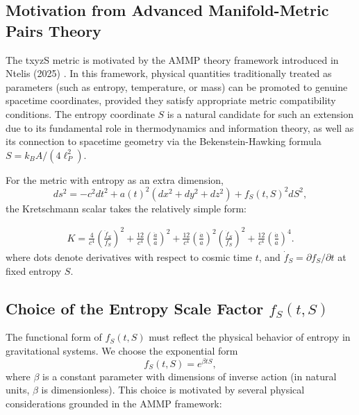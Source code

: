 \documentclass[11pt,a4paper]{article}
\begin{document}
\subsection{Motivation from Advanced Manifold-Metric Pairs Theory}

The txyzS metric is motivated by the AMMP theory framework introduced in Ntelis (2025) \cite{Ntelis2025_AMMP}. In this framework, physical quantities traditionally treated as parameters (such as entropy, temperature, or mass) can be promoted to genuine spacetime coordinates, provided they satisfy appropriate metric compatibility conditions. The entropy coordinate $S$ is a natural candidate for such an extension due to its fundamental role in thermodynamics and information theory, as well as its connection to spacetime geometry via the Bekenstein-Hawking formula $S = k_B A/(4\ell_P^2)$.

For the metric with entropy as an extra dimension,
\begin{equation}
ds^2 = -c^2 dt^2 + a(t)^2 (dx^2+dy^2+dz^2) + f_S(t,S)^2 dS^2,
\end{equation}
the Kretschmann scalar takes the relatively simple form:

\begin{align}
K = \frac{4}{c^4}\left(\frac{\ddot{f}_S}{f_S}\right)^2 
+ \frac{12}{c^4}\left(\frac{\ddot{a}}{a}\right)^2 
+ \frac{12}{c^4}\left(\frac{\dot{a}}{a}\right)^2\left(\frac{\dot{f}_S}{f_S}\right)^2 
+ \frac{12}{c^4}\left(\frac{\dot{a}}{a}\right)^4.
\end{align}
where dots denote derivatives with respect to cosmic time $t$, and 
$\dot{f}_S = \partial f_S/\partial t$ at fixed entropy $S$.

\subsection{Choice of the Entropy Scale Factor $f_S(t,S)$}

The functional form of $f_S(t,S)$ must reflect the physical behavior of entropy in gravitational systems. We choose the exponential form
\begin{equation}
f_S(t,S) = e^{\beta t S},
\end{equation}
where $\beta$ is a constant parameter with dimensions of inverse action (in natural units, $\beta$ is dimensionless). This choice is motivated by several physical considerations grounded in the AMMP framework:
\end{document}
